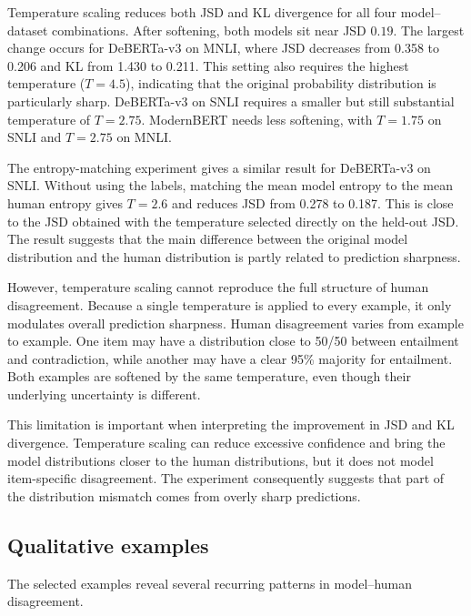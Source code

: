 \documentclass[11pt,a4paper]{article}
\begin{document}
Temperature scaling reduces both JSD and KL divergence for all four model--dataset combinations. After softening, both models sit near JSD $0.19$. The largest change occurs for DeBERTa-v3 on MNLI, where JSD decreases from 0.358 to 0.206 and KL from 1.430 to 0.211. This setting also requires the highest temperature ($T=4.5$), indicating that the original probability distribution is particularly sharp. DeBERTa-v3 on SNLI requires a smaller but still substantial temperature of $T=2.75$. ModernBERT needs less softening, with $T=1.75$ on SNLI and $T=2.75$ on MNLI.

The entropy-matching experiment gives a similar result for DeBERTa-v3 on SNLI. Without using the labels, matching the mean model entropy to the mean human entropy gives $T=2.6$ and reduces JSD from 0.278 to 0.187. This is close to the JSD obtained with the temperature selected directly on the held-out JSD. The result suggests that the main difference between the original model distribution and the human distribution is partly related to prediction sharpness.

However, temperature scaling cannot reproduce the full structure of human disagreement. Because a single temperature is applied to every example, it only modulates overall prediction sharpness. Human disagreement varies from example to example. One item may have a distribution close to 50/50 between entailment and contradiction, while another may have a clear 95\% majority for entailment. Both examples are softened by the same temperature, even though their underlying uncertainty is different.

This limitation is important when interpreting the improvement in JSD and KL divergence. Temperature scaling can reduce excessive confidence and bring the model distributions closer to the human distributions, but it does not model item-specific disagreement. The experiment consequently suggests that part of the distribution mismatch comes from overly sharp predictions.

\subsection{Qualitative examples}

The selected examples reveal several recurring patterns in model--human disagreement.
\end{document}
